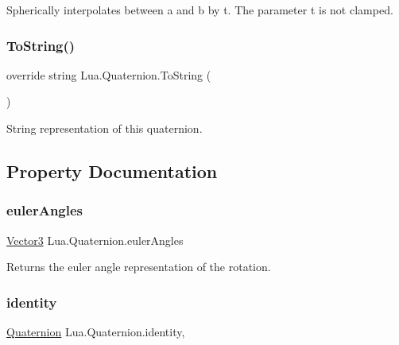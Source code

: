 Spherically interpolates between a and b by t. The parameter t is not clamped. 

\mbox{\label{class_lua_1_1_quaternion_a72a4b219c3442e088c7ee963feb1b372}} 
\subsubsection{\texorpdfstring{ToString()}{ToString()}}
{\footnotesize\ttfamily override string Lua.\+Quaternion.\+To\+String (\begin{DoxyParamCaption}{ }\end{DoxyParamCaption})}



String representation of this quaternion. 



\subsection{Property Documentation}
\mbox{\label{class_lua_1_1_quaternion_ac50cf6b67c4cb0363b834b7054cdd5fa}} 
\subsubsection{\texorpdfstring{eulerAngles}{eulerAngles}}
{\footnotesize\ttfamily \mbox{\hyperlink{class_lua_1_1_vector3}{Vector3}} Lua.\+Quaternion.\+euler\+Angles\hspace{0.3cm}{\ttfamily [get]}}



Returns the euler angle representation of the rotation. 

\mbox{\label{class_lua_1_1_quaternion_ac7d56f4c2496af59e66550e35bff614c}} 
\subsubsection{\texorpdfstring{identity}{identity}}
{\footnotesize\ttfamily \mbox{\hyperlink{class_lua_1_1_quaternion}{Quaternion}} Lua.\+Quaternion.\+identity\hspace{0.3cm}{\ttfamily [static]}, {\ttfamily [get]}}



